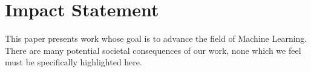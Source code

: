 \documentclass{article}
\theoremstyle{plain}
\theoremstyle{definition}
\theoremstyle{remark}
\begin{document}
\section*{Impact Statement}
This paper presents work whose goal is to advance the field of
Machine Learning. There are many potential societal consequences
of our work, none which we feel must be specifically highlighted here.










\newpage
\appendix
\onecolumn
\end{document}
